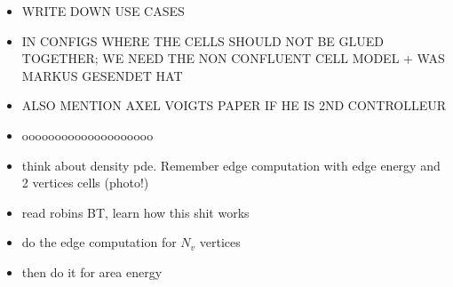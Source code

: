 \begin{itemize}
    \item WRITE DOWN USE CASES 
    \item IN CONFIGS WHERE THE CELLS SHOULD NOT BE GLUED TOGETHER; WE NEED THE NON CONFLUENT CELL MODEL + WAS MARKUS GESENDET HAT 
    \item ALSO MENTION AXEL VOIGTS PAPER IF HE IS 2ND CONTROLLEUR 
    \item oooooooooooooooooooo
    \item think about density pde. Remember edge computation with edge energy and 2 vertices cells (photo!)
    \item read robins BT, learn how this shit works 
    \item do the edge computation for $N_v$ vertices 
    \item then do it for area energy       
\end{itemize}